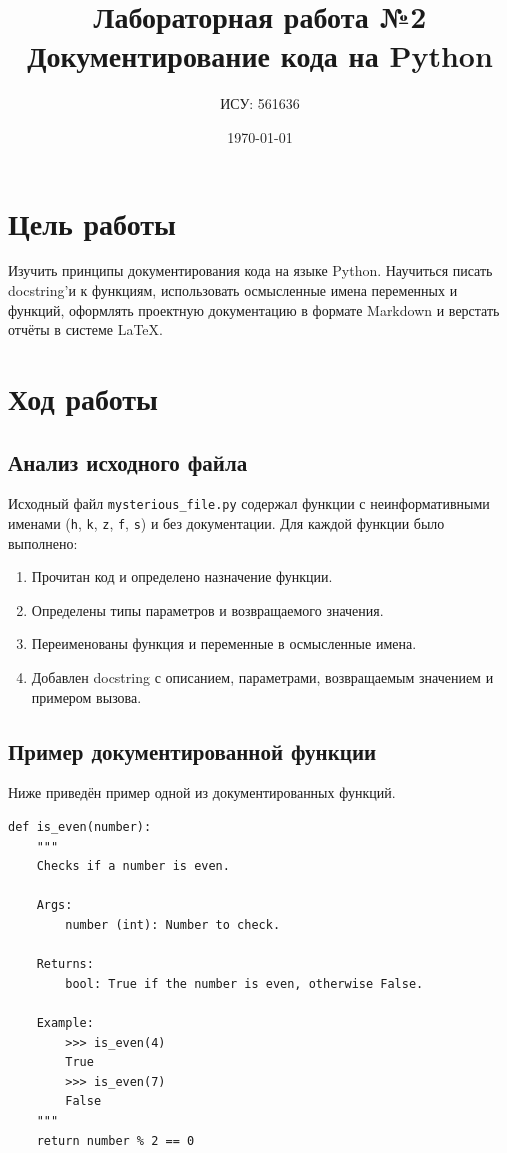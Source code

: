 \documentclass[a4paper,12pt]{article}
\title{Лабораторная работа №2\\Документирование кода на Python}
\author{ИСУ: 561636}
\date{\today}
\begin{document}
\maketitle
\thispagestyle{empty}

\newpage
\tableofcontents
\newpage

\section{Цель работы}

Изучить принципы документирования кода на языке Python. Научиться
писать docstring'и к функциям, использовать осмысленные имена
переменных и функций, оформлять проектную документацию в формате
Markdown и верстать отчёты в системе LaTeX.

\section{Ход работы}

\subsection{Анализ исходного файла}

Исходный файл \texttt{mysterious\_file.py} содержал функции с
неинформативными именами (\texttt{h}, \texttt{k}, \texttt{z},
\texttt{f}, \texttt{s}) и без документации. Для каждой функции
было выполнено:

\begin{enumerate}
    \item Прочитан код и определено назначение функции.
    \item Определены типы параметров и возвращаемого значения.
    \item Переименованы функция и переменные в осмысленные имена.
    \item Добавлен docstring с описанием, параметрами, возвращаемым
          значением и примером вызова.
\end{enumerate}

\subsection{Пример документированной функции}

Ниже приведён пример одной из документированных функций.

\begin{lstlisting}[caption={Функция \texttt{is\_even}}]
def is_even(number):
    """
    Checks if a number is even.

    Args:
        number (int): Number to check.

    Returns:
        bool: True if the number is even, otherwise False.

    Example:
        >>> is_even(4)
        True
        >>> is_even(7)
        False
    """
    return number % 2 == 0
\end{lstlisting}
\end{document}
